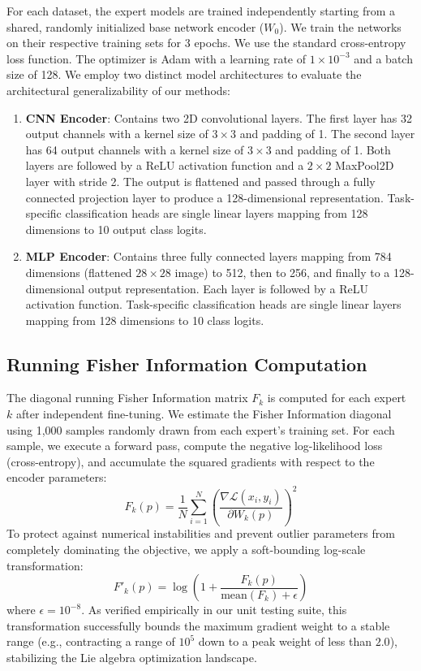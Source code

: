 \documentclass{article}
\theoremstyle{plain}
\theoremstyle{definition}
\theoremstyle{remark}
\begin{document}
For each dataset, the expert models are trained independently starting from a shared, randomly initialized base network encoder ($W_0$). We train the networks on their respective training sets for 3 epochs. We use the standard cross-entropy loss function. The optimizer is Adam with a learning rate of $1 \times 10^{-3}$ and a batch size of 128. We employ two distinct model architectures to evaluate the architectural generalizability of our methods:
\begin{enumerate}
    \item \textbf{CNN Encoder}: Contains two 2D convolutional layers. The first layer has 32 output channels with a kernel size of $3 \times 3$ and padding of 1. The second layer has 64 output channels with a kernel size of $3 \times 3$ and padding of 1. Both layers are followed by a ReLU activation function and a $2 \times 2$ MaxPool2D layer with stride 2. The output is flattened and passed through a fully connected projection layer to produce a 128-dimensional representation. Task-specific classification heads are single linear layers mapping from 128 dimensions to 10 output class logits.
    \item \textbf{MLP Encoder}: Contains three fully connected layers mapping from 784 dimensions (flattened $28 \times 28$ image) to 512, then to 256, and finally to a 128-dimensional output representation. Each layer is followed by a ReLU activation function. Task-specific classification heads are single linear layers mapping from 128 dimensions to 10 class logits.
\end{enumerate}

\subsection{Running Fisher Information Computation}
The diagonal running Fisher Information matrix $F_k$ is computed for each expert $k$ after independent fine-tuning. We estimate the Fisher Information diagonal using 1,000 samples randomly drawn from each expert's training set. For each sample, we execute a forward pass, compute the negative log-likelihood loss (cross-entropy), and accumulate the squared gradients with respect to the encoder parameters:
\begin{equation}
    F_k(p) = \frac{1}{N} \sum_{i=1}^N \left( \frac{\nabla \mathcal{L}(x_i, y_i)}{\partial W_k(p)} \right)^2
\end{equation}
To protect against numerical instabilities and prevent outlier parameters from completely dominating the objective, we apply a soft-bounding log-scale transformation:
\begin{equation}
    F'_k(p) = \log \left( 1 + \frac{F_k(p)}{\text{mean}(F_k) + \epsilon} \right)
\end{equation}
where $\epsilon = 10^{-8}$. As verified empirically in our unit testing suite, this transformation successfully bounds the maximum gradient weight to a stable range (e.g., contracting a range of $10^5$ down to a peak weight of less than $2.0$), stabilizing the Lie algebra optimization landscape.
\end{document}
